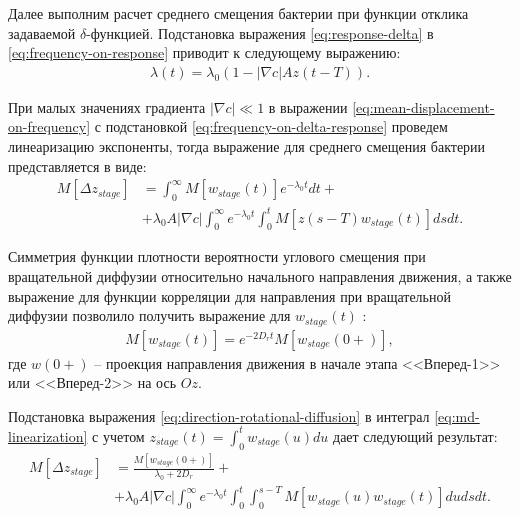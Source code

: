 Далее выполним расчет среднего смещения бактерии при функции отклика задаваемой $\delta$-функцией. Подстановка выражения \cref{eq:response-delta} в \cref{eq:frequency-on-response} приводит к следующему выражению:
\begin{equation}
    \begin{aligned}
        \lambda(t)=\lambda_0 \left ( 1 - |\nabla c| Az(t-T) \right ).
    \label{eq:frequency-on-delta-response}
    \end{aligned}
\end{equation}

При малых значениях градиента $|\nabla c| \ll 1$ в выражении \cref{eq:mean-displacement-on-frequency} с подстановкой \cref{eq:frequency-on-delta-response} проведем линеаризацию экспоненты, тогда выражение для среднего смещения бактерии представляется в виде:
\begin{equation}
    \begin{aligned}
        M\left [\Delta z_{stage} \right ]&=\int_0^{\infty} M\left [w_{stage}(t) \right ] e^{-\lambda_0 t}dt + \\ &+ \lambda_0 A |\nabla c|  \int_0^{\infty} e^{-\lambda_0 t} \int_0^t M\left [z(s-T)w_{stage}(t) \right ]ds dt.
    \label{eq:md-linearization}
    \end{aligned}
\end{equation}

Симметрия функции плотности вероятности углового смещения при вращательной диффузии относительно начального направления движения, а также выражение для функции корреляции для направления при вращательной диффузии позволило получить выражение для $w_{stage}(t)$ \cite{locsei_persistence_2007}:
\begin{equation}
    \begin{aligned}
        M\left [w_{stage}(t) \right ] = e^{-2 D_r t}M\left [w_{stage}(0+) \right ],
    \label{eq:direction-rotational-diffusion}
    \end{aligned}
\end{equation}
где $w(0+)$ -- проекция направления движения в начале этапа <<Вперед-1>> или <<Вперед-2>> на ось $Oz$.

Подстановка выражения \cref{eq:direction-rotational-diffusion} в интеграл \cref{eq:md-linearization} с учетом $z_{stage}(t) = \int_{0}^{t} w_{stage}(u)du$ дает следующий результат:
\begin{equation}
    \begin{aligned}
        M\left [\Delta z_{stage} \right ]&=\frac{M\left [w_{stage}(0+) \right ]}{\lambda_0+2 D_r} + \\ &+ \lambda_0 A |\nabla c|  \int_0^{\infty} e^{-\lambda_0 t} \int_0^t \int_0^{s-T} M\left [w_{stage}(u)w_{stage}(t) \right ]du ds dt.
    \label{eq:mdl-with-rotational-diffusion}
    \end{aligned}
\end{equation}

